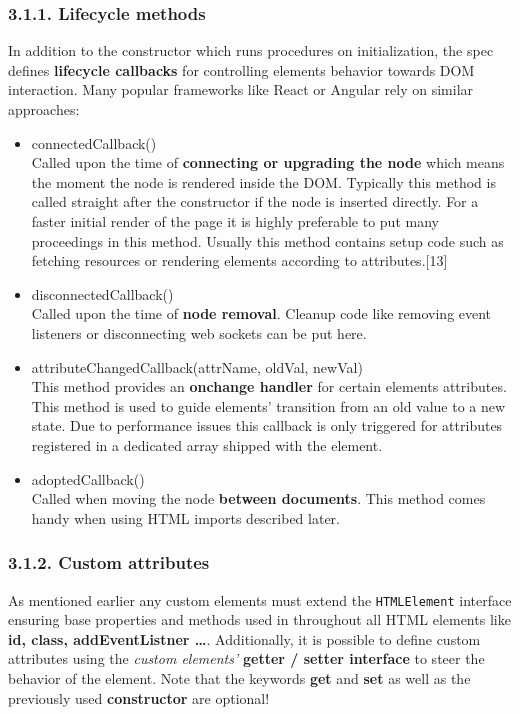 \documentclass[]{article}
\providecommand{\tightlist}{%
  \setlength{\itemsep}{0pt}\setlength{\parskip}{0pt}}
\begin{document}
\subsubsection{3.1.1. Lifecycle methods}\label{lifecycle-methods}

In addition to the constructor which runs procedures on initialization,
the spec defines \textbf{lifecycle callbacks} for controlling elements
behavior towards DOM interaction. Many popular frameworks like React or
Angular rely on similar approaches:

\begin{itemize}
\tightlist
\item
  connectedCallback()\\
  Called upon the time of \textbf{connecting or upgrading the node}
  which means the moment the node is rendered inside the DOM. Typically
  this method is called straight after the constructor if the node is
  inserted directly. For a faster initial render of the page it is
  highly preferable to put many proceedings in this method. Usually this
  method contains setup code such as fetching resources or rendering
  elements according to attributes.{[}13{]}
\item
  disconnectedCallback()\\
  Called upon the time of \textbf{node removal}. Cleanup code like
  removing event listeners or disconnecting web sockets can be put here.
\item
  attributeChangedCallback(attrName, oldVal, newVal)\\
  This method provides an \textbf{onchange handler} for certain elements
  attributes. This method is used to guide elements' transition from an
  old value to a new state. Due to performance issues this callback is
  only triggered for attributes registered in a dedicated array shipped
  with the element.
\item
  adoptedCallback()\\
  Called when moving the node \textbf{between documents}. This method
  comes handy when using HTML imports described later.
\end{itemize}

\subsubsection{3.1.2. Custom attributes}\label{custom-attributes}

As mentioned earlier any custom elements must extend the
\texttt{HTMLElement} interface ensuring base properties and methods used
in throughout all HTML elements like \textbf{id, class, addEventListner
\ldots{}}. Additionally, it is possible to define custom attributes
using the \emph{custom elements'} \textbf{getter / setter interface} to
steer the behavior of the element. Note that the keywords \textbf{get}
and \textbf{set} as well as the previously used \textbf{constructor} are
optional!
\end{document}
